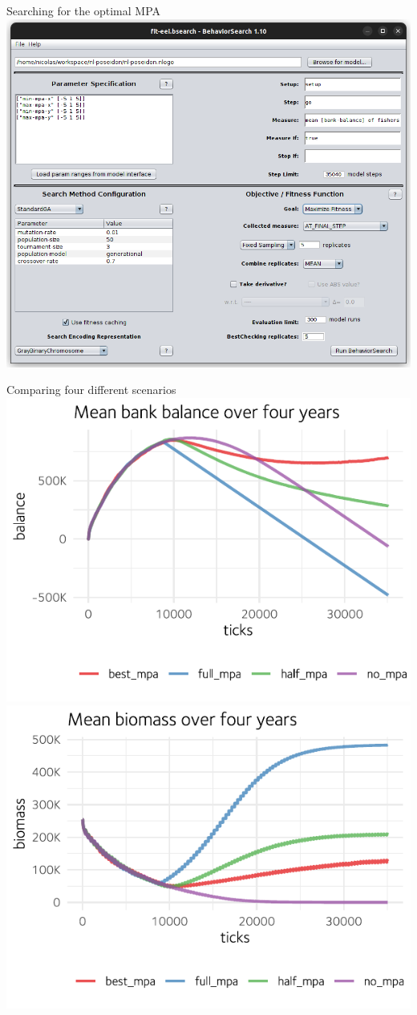 \documentclass[table, 14pt, aspectratio=169]{beamer}
\begin{document}
\begin{frame}{Searching for the optimal MPA}
  \centering
  \includegraphics[height=0.8\textheight]{images/bsearch_mpa.png}
\end{frame}

\begin{frame}{Comparing four different scenarios}
  \includegraphics[width=0.49\linewidth]{images/experiment_balance.pdf}
  \hfill
  \includegraphics[width=0.49\linewidth]{images/experiment_biomass.pdf}
\end{frame}
\end{document}
